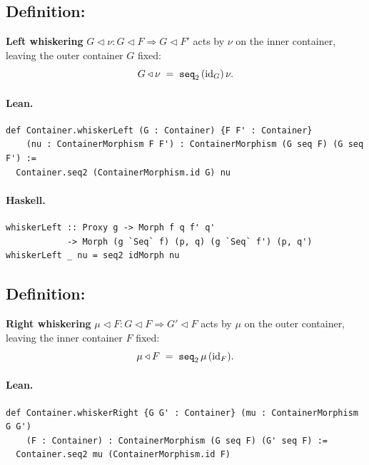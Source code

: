 \documentclass[11pt,a4paper]{article}
\begin{document}
\subsection{Definition: }

\begin{defn}
\textbf{Left whiskering} $G \triangleleft \nu : G \triangleleft F \Rightarrow G \triangleleft F'$
acts by $\nu$ on the inner container, leaving the outer container $G$ fixed:
\[
  G \triangleleft \nu \;=\; \texttt{seq}_2\,(\mathrm{id}_G)\,\nu.
\]
\end{defn}

\paragraph{Lean.}
\begin{lstlisting}[style=lean]
def Container.whiskerLeft (G : Container) {F F' : Container}
    (nu : ContainerMorphism F F') : ContainerMorphism (G seq F) (G seq F') :=
  Container.seq2 (ContainerMorphism.id G) nu
\end{lstlisting}

\paragraph{Haskell.}
\begin{lstlisting}[style=haskell]
whiskerLeft :: Proxy g -> Morph f q f' q'
            -> Morph (g `Seq` f) (p, q) (g `Seq` f') (p, q')
whiskerLeft _ nu = seq2 idMorph nu
\end{lstlisting}


\subsection{Definition: }

\begin{defn}
\textbf{Right whiskering} $\mu \triangleleft F : G \triangleleft F \Rightarrow G' \triangleleft F$
acts by $\mu$ on the outer container, leaving the inner container $F$ fixed:
\[
  \mu \triangleleft F \;=\; \texttt{seq}_2\,\mu\,(\mathrm{id}_F).
\]
\end{defn}

\paragraph{Lean.}
\begin{lstlisting}[style=lean]
def Container.whiskerRight {G G' : Container} (mu : ContainerMorphism G G')
    (F : Container) : ContainerMorphism (G seq F) (G' seq F) :=
  Container.seq2 mu (ContainerMorphism.id F)
\end{lstlisting}
\end{document}
